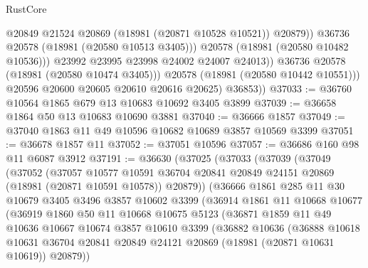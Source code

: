 \begin{lexlean}{RustCore}
\begin{coremodule}
                          @20849
                          @21524
                          @20869
                          (@18981 (@20871 @10528 @10521))
                          @20879))
                      @36736
                      @20578
                      (@18981 (@20580 @10513 @3405)))
                    @20578
                    (@18981 (@20580 @10482 @10536)))
                  @23992
                  @23995
                  @23998
                  @24002
                  @24007
                  @24013))
              @36736
              @20578
              (@18981 (@20580 @10474 @3405)))
            @20578
            (@18981 (@20580 @10442 @10551)))
          @20596
          @20600
          @20605
          @20610
          @20616
          @20625)
        @36853))
@37033 := @36760 @10564 @1865 @679 @13 @10683 @10692 @3405 @3899
@37039 := @36658 @1864 @50 @13 @10683 @10690 @3881
@37040 := @36666 @1857
@37049 := @37040 @1863 @11 @49 @10596 @10682 @10689 @3857 @10569 @3399
@37051 := @36678 @1857 @11
@37052 := @37051 @10596
@37057 := @36686 @160 @98 @11 @6087 @3912
@37191 := @36630
    (@37025
      (@37033
        (@37039
          (@37049
            (@37052
              (@37057
                @10577
                @10591
                @36704
                @20841
                @20849
                @24151
                @20869
                (@18981 (@20871 @10591 @10578))
                @20879))
            (@36666
              @1861
              @285
              @11
              @30
              @10679
              @3405
              @3496
              @3857
              @10602
              @3399
              (@36914
                @1861
                @11
                @10668
                @10677
                (@36919
                  @1860
                  @50
                  @11
                  @10668
                  @10675
                  @5123
                  (@36871
                    @1859
                    @11
                    @49
                    @10636
                    @10667
                    @10674
                    @3857
                    @10610
                    @3399
                    (@36882
                      @10636
                      (@36888
                        @10618
                        @10631
                        @36704
                        @20841
                        @20849
                        @24121
                        @20869
                        (@18981 (@20871 @10631 @10619))
                        @20879))

\end{coremodule}
\end{lexlean}
